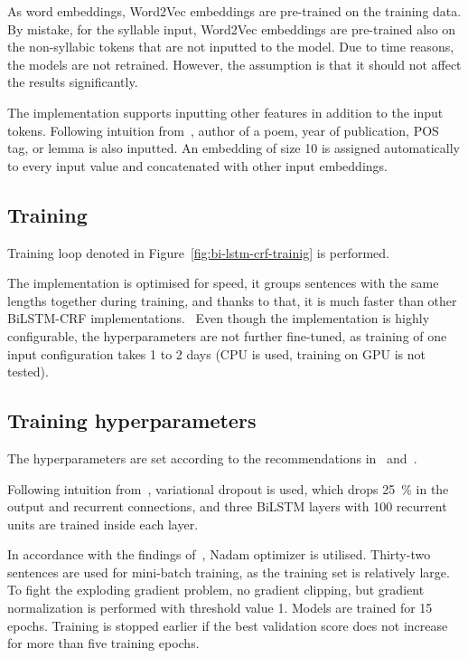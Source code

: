 As word embeddings, Word2Vec embeddings are pre-trained on the training data. By mistake, for the syllable input, Word2Vec embeddings are pre-trained also on the non-syllabic tokens that are not inputted to the model. Due to time reasons, the models are not retrained. However, the assumption is that it should not affect the results significantly.

The implementation supports inputting other features in addition to the input tokens. Following intuition from~\cite{KVETA}, author of a poem, year of publication, POS tag, or lemma is also inputted. An embedding of size 10 is assigned automatically to every input value and concatenated with other input embeddings.

\subsection{Training}
Training loop denoted in Figure~\ref{fig:bi-lstm-crf-trainig} is performed.

The implementation is optimised for speed, it groups sentences with the same lengths together during training, and thanks to that, it is much faster than other BiLSTM-CRF implementations.~\cite{GitBiLSTMCRF} Even though the implementation is highly configurable, the hyperparameters are not further fine-tuned, as training of one input configuration takes 1 to 2 days (CPU is used, training on GPU is not tested).

\subsection{Training hyperparameters}
The hyperparameters are set according to the recommendations in~\cite{MetricalTaggingInTheWild} and~\cite{BiLSTMCRFHyperparameters}.

Following intuition from~\cite{MetricalTaggingInTheWild}, variational dropout is used, which drops 25~\% in the output and recurrent connections, and three BiLSTM layers with 100 recurrent units are trained inside each layer.

In accordance with the findings of~\cite{BiLSTMCRFHyperparameters}, Nadam optimizer is utilised. Thirty-two sentences are used for mini-batch training, as the training set is relatively large. To fight the exploding gradient problem, no gradient clipping, but gradient normalization is performed with threshold value 1. Models are trained for 15 epochs. Training is stopped earlier if the best validation score does not increase for more than five training epochs.

